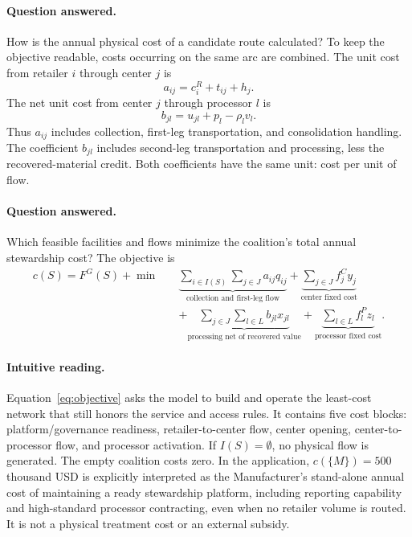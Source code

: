 \paragraph{Question answered.}
How is the annual physical cost of a candidate route calculated? To keep the objective readable, costs occurring on the same arc are combined. The unit cost from retailer $i$ through center $j$ is
\begin{equation}
\label{eq:ch4_upstream_unit_cost}
a_{ij}=c_i^R+t_{ij}+h_j.
\end{equation}
The net unit cost from center $j$ through processor $l$ is
\begin{equation}
\label{eq:ch4_downstream_unit_cost}
b_{jl}=u_{jl}+p_l-\rho_l v_l.
\end{equation}
Thus $a_{ij}$ includes collection, first-leg transportation, and consolidation handling. The coefficient $b_{jl}$ includes second-leg transportation and processing, less the recovered-material credit. Both coefficients have the same unit: cost per unit of flow.

\paragraph{Question answered.}
Which feasible facilities and flows minimize the coalition's total annual stewardship cost? The objective is
\begin{equation}
\label{eq:objective}
\begin{aligned}
c(S)=F^G(S)+\min \quad
&\underbrace{\sum_{i\in I(S)}\sum_{j\in J}a_{ij}q_{ij}}_{\text{collection and first-leg flow}}
+\underbrace{\sum_{j\in J}f_j^C y_j}_{\text{center fixed cost}}\\
&+\underbrace{\sum_{j\in J}\sum_{l\in L}b_{jl}x_{jl}}_{\text{processing net of recovered value}}
+\underbrace{\sum_{l\in L}f_l^P z_l}_{\text{processor fixed cost}}.
\end{aligned}
\end{equation}

\paragraph{Intuitive reading.}
Equation~\eqref{eq:objective} asks the model to build and operate the least-cost network that still honors the service and access rules. It contains five cost blocks: platform/governance readiness, retailer-to-center flow, center opening, center-to-processor flow, and processor activation. If $I(S)=\emptyset$, no physical flow is generated. The empty coalition costs zero. In the application, $c(\{M\})=500$ thousand USD is explicitly interpreted as the Manufacturer's stand-alone annual cost of maintaining a ready stewardship platform, including reporting capability and high-standard processor contracting, even when no retailer volume is routed. It is not a physical treatment cost or an external subsidy.

